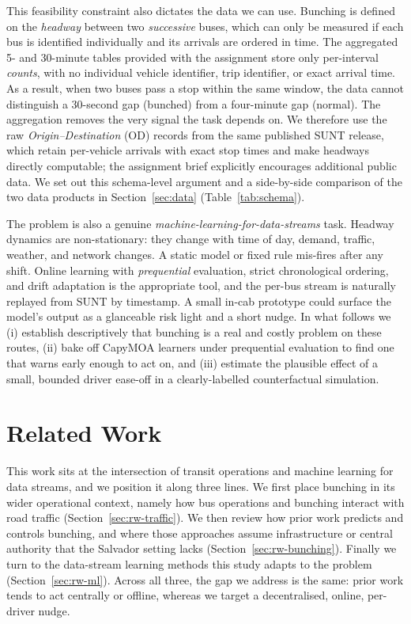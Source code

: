 \documentclass[11pt,a4paper]{article}
\begin{document}
This feasibility constraint also dictates the data we can use. Bunching is defined on the
\emph{headway} between two \emph{successive} buses, which can only be measured if each bus is
identified individually and its arrivals are ordered in time. The aggregated 5- and 30-minute
tables provided with the assignment store only per-interval \emph{counts}, with no individual
vehicle identifier, trip identifier, or exact arrival time. As a result, when two buses pass a stop
within the same window, the data cannot distinguish a 30-second gap (bunched) from a four-minute gap
(normal). The aggregation removes the very signal the task depends on. We therefore use the raw
\emph{Origin--Destination} (OD) records from the same published SUNT release, which retain
per-vehicle arrivals with exact stop times and make headways directly computable; the assignment
brief explicitly encourages additional public data. We set out this schema-level argument and a
side-by-side comparison of the two data products in Section~\ref{sec:data} (Table~\ref{tab:schema}).

The problem is also a genuine \emph{machine-learning-for-data-streams} task. Headway dynamics
are non-stationary: they change with time of day, demand, traffic, weather, and network
changes. A static model or fixed rule mis-fires after any shift. Online learning with
\emph{prequential} evaluation, strict chronological ordering, and drift adaptation
\citep{Bifet2007} is the appropriate tool, and the per-bus stream is naturally replayed from
SUNT by timestamp. A small in-cab prototype could surface the model's output as a glanceable
risk light and a short nudge. In what follows we (i) establish descriptively that bunching is a
real and costly problem on these routes, (ii) bake off CapyMOA learners under prequential
evaluation to find one that warns early enough to act on, and (iii) estimate the plausible effect
of a small, bounded driver ease-off in a clearly-labelled counterfactual simulation.

\section{Related Work}
\label{sec:related}

This work sits at the intersection of transit operations and machine learning for data streams, and
we position it along three lines. We first place bunching in its wider operational context, namely how
bus operations and bunching interact with road traffic (Section~\ref{sec:rw-traffic}). We then review
how prior work predicts and controls bunching, and where those approaches assume infrastructure or
central authority that the Salvador setting lacks (Section~\ref{sec:rw-bunching}). Finally we turn to
the data-stream learning methods this study adapts to the problem (Section~\ref{sec:rw-ml}). Across
all three, the gap we address is the same: prior work tends to act centrally or offline, whereas we
target a decentralised, online, per-driver nudge.
\end{document}
